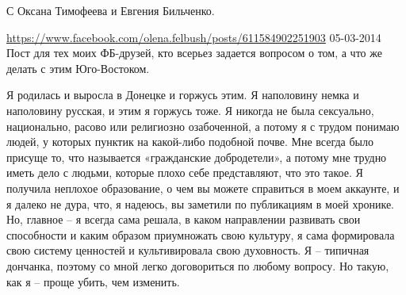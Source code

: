 С Оксана Тимофеева и Евгения Бильченко.

\url{https://www.facebook.com/olena.felbush/posts/611584902251903}
05-03-2014
Пост для тех моих ФБ-друзей, кто всерьез задается вопросом о том, а что же делать с этим Юго-Востоком.

Я родилась и выросла в Донецке и горжусь этим. Я наполовину немка и наполовину
русская, и этим я горжусь тоже. Я никогда не была сексуально, национально,
расово или религиозно озабоченной, а потому я с трудом понимаю людей, у которых
пунктик на какой-либо подобной почве. Мне всегда было присуще то, что
называется «гражданские добродетели», а потому мне трудно иметь дело с людьми,
которые плохо себе представляют, что это такое. Я получила неплохое
образование, о чем вы можете справиться в моем аккаунте, и я далеко не дура,
что, я надеюсь, вы заметили по публикациям в моей хронике. Но, главное – я
всегда сама решала, в каком направлении развивать свои способности и каким
образом приумножать свою культуру, я сама формировала свою систему ценностей и
культивировала свою духовность.  Я – типичная дончанка, поэтому со мной легко
договориться по любому вопросу. Но такую, как я – проще убить, чем изменить.

